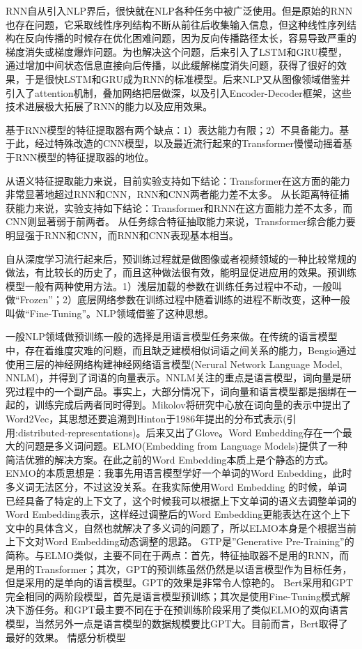 \documentclass{clv3}
\begin{document}
RNN自从引入NLP界后，很快就在NLP各种任务中被广泛使用。但是原始的RNN也存在问题，它采取线性序列结构不断从前往后收集输入信息，但这种线性序列结构在反向传播的时候存在优化困难问题，因为反向传播路径太长，容易导致严重的梯度消失或梯度爆炸问题。为也解决这个问题，后来引入了LSTM\cite{lstm}和GRU\cite{gru}模型，通过增加中间状态信息直接向后传播，以此缓解梯度消失问题，获得了很好的效果，于是很快LSTM和GRU成为RNN的标准模型。后来NLP又从图像领域借鉴并引入了attention机制，叠加网络把层做深，以及引入Encoder-Decoder框架，这些技术进展极大拓展了RNN的能力以及应用效果。

基于RNN模型的特征提取器有两个缺点：1）表达能力有限；2）不具备能力。基于此，经过特殊改造的CNN\cite{cnn}模型，以及最近流行起来的Transformer\cite{transfomer}慢慢动摇着基于RNN模型的特征提取器的地位。

从语义特征提取能力来说，目前实验支持如下结论：Transformer在这方面的能力非常显著地超过RNN和CNN，RNN和CNN两者能力差不太多。
从长距离特征捕获能力来说，实验支持如下结论：Transformer和RNN在这方面能力差不太多，而CNN则显著弱于前两者。
从任务综合特征抽取能力来说，Transformer综合能力要明显强于RNN和CNN，而RNN和CNN表现基本相当。

自从深度学习流行起来后，预训练过程就是做图像或者视频领域的一种比较常规的做法，有比较长的历史了，而且这种做法很有效，能明显促进应用的效果。预训练模型一般有两种使用方法。1）浅层加载的参数在训练任务过程中不动，一般叫做“Frozen”；2）底层网络参数在训练过程中随着训练的进程不断改变，这种一般叫做“Fine-Tuning”。NLP领域借鉴了这种思想。

一般NLP领域做预训练一般的选择是用语言模型任务来做。在传统的语言模型中，存在着维度灾难的问题，而且缺乏建模相似词语之间关系的能力，Bengio\cite{nnlm}通过使用三层的神经网络构建神经网络语言模型(Nerural Network Language Model, NNLM)，并得到了词语的向量表示。NNLM关注的重点是语言模型，词向量是研究过程中的一个副产品。事实上，大部分情况下，词向量和语言模型都是捆绑在一起的，训练完成后两者同时得到。Mikolov将研究中心放在词向量的表示中提出了Word2Vec，其思想还要追溯到Hinton于1986年提出的分布式表示(引用:distributed-representations)。后来又出了Glove\cite{glove}。Word Embedding存在一个最大的问题是多义词问题。ELMO(Embedding from Language Models)\cite{elmo}提供了一种简洁优雅的解决方案。在此之前的Word Embedding本质上是个静态的方式。ENMO的本质思想是：我事先用语言模型学好一个单词的Word Enbedding，此时多义词无法区分，不过这没关系。在我实际使用Word Embedding 的时候，单词已经具备了特定的上下文了，这个时候我可以根据上下文单词的语义去调整单词的Word Embedding表示，这样经过调整后的Word Embedding更能表达在这个上下文中的具体含义，自然也就解决了多义词的问题了，所以ELMO本身是个根据当前上下文对Word Embedding动态调整的思路。
GTP\cite{gpt}是”Generative Pre-Training”的简称。与ELMO类似，主要不同在于两点：首先，特征抽取器不是用的RNN，而是用的Transformer；其次，GPT的预训练虽然仍然是以语言模型作为目标任务，但是采用的是单向的语言模型。GPT的效果是非常令人惊艳的。
Bert\cite{bert}采用和GPT完全相同的两阶段模型，首先是语言模型预训练；其次是使用Fine-Tuning模式解决下游任务。和GPT最主要不同在于在预训练阶段采用了类似ELMO的双向语言模型，当然另外一点是语言模型的数据规模要比GPT大。目前而言，Bert取得了最好的效果。
情感分析模型
\end{document}
